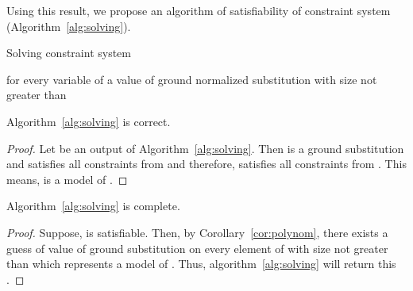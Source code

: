 Using this result, we propose an algorithm of satisfiability of constraint system (Algorithm~\ref{alg:solving}).


\begin{algorithm}[H]
  \caption{Solving constraint system}
  \label{alg:solving}
  \BlankLine
\Guess for every variable of  a value of ground normalized substitution  with size not greater than \;
\end{algorithm}






\begin{prop}
	Algorithm~\ref{alg:solving} is correct.
\begin{proof}
Let  be an output of Algorithm~\ref{alg:solving}. Then  is a ground substitution and  satisfies all constraints from  and therefore, satisfies all constraints from  . This means,  is a model of .
\end{proof}

\end{prop}

\begin{prop}
	Algorithm~\ref{alg:solving} is complete.
\begin{proof}
Suppose,  is satisfiable.  Then, by Corollary~\ref{cor:polynom}, there exists a guess of value of ground substitution on every element of   with size not greater than   which represents a model  of . Thus, algorithm~\ref{alg:solving} will return this .

\end{proof}

\end{prop}
